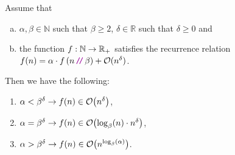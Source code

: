 \begin{Theorem} 
  Assume that 
  \begin{enumerate}[(a)]
  \item $\alpha,\beta \in \mathbb{N}$ such that  $\beta \geq 2$, $\delta \in \mathbb{R}$ such that $\delta \geq
    0$ and
  \item the function $f:{\mathbb N} \rightarrow {\mathbb R}_+$ satisfies the recurrence relation
        \\[0.2cm]
        \hspace*{1.3cm}
        $f(n) = \alpha \cdot f\left(n \dv \beta\right) + \Oh(n^\delta)$.
  \end{enumerate}
  Then we have the following:
  \begin{enumerate}
  \item $\alpha < \beta^\delta\rightarrow f(n) \in \mathcal{O}\bigl(n^{\delta}\bigr)$,
  \item $\alpha = \beta^\delta\rightarrow f(n) \in \mathcal{O}\bigl(\log_\beta(n) \cdot n^{\delta}\bigr)$,
  \item $\alpha > \beta^{\delta} \rightarrow f(n) \in \mathcal{O}\bigl(n^{\log_{\beta}(\alpha)}\bigr)$. 
  \end{enumerate}
\end{Theorem}

